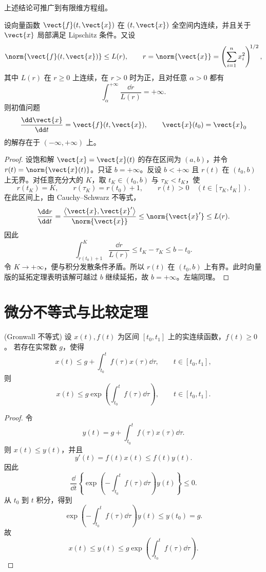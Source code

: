 上述结论可推广到有限维方程组。

\begin{theorem}[Wintner 定理]\label{cor:Wintner延拓定理}
	设向量函数 $\vect{f}(t,\vect{x})$ 在
	$(t,\vect{x})$ 全空间内连续，并且关于 $\vect{x}$ 局部满足
	Lipschitz 条件。又设
	\[
		\norm{\vect{f}(t,\vect{x})}\leq L(r),
		\qquad
		r=\norm{\vect{x}}
		=\left(\sum_{i=1}^{n}x_i^2\right)^{\!1/2},
	\]
	其中 $L(r)$ 在 $r\geq0$ 上连续，在 $r>0$ 时为正，且对任意
	$\alpha>0$ 都有
	\[
		\int_{\alpha}^{+\infty}\dfrac{\dd r}{L(r)}=+\infty.
	\]
	则初值问题
	\[
		\dfrac{\dd\vect{x}}{\dd t}=\vect{f}(t,\vect{x}),
		\qquad
		\vect{x}(t_0)=\vect{x}_0
	\]
	的解存在于 $(-\infty,+\infty)$ 上。
\end{theorem}

\begin{proof}
	设饱和解 $\vect{x}=\vect{x}(t)$ 的存在区间为 $(a,b)$，并令
	$r(t)=\norm{\vect{x}(t)}$。只证 $b=+\infty$。反设 $b<+\infty$ 且
	$r(t)$ 在 $(t_0,b)$ 上无界。对任意充分大的 $K$，取
	$t_K\in(t_0,b)$ 与 $\tau_K<t_K$，使
	\[
		r(t_K)=K,
		\qquad
		r(\tau_K)=r(t_0)+1,
		\qquad
		r(t)>0\quad(t\in[\tau_K,t_K]).
	\]
	在此区间上，由 Cauchy--Schwarz 不等式，
	\[
		\dfrac{\dd r}{\dd t}
		=\dfrac{\left\langle\vect{x},\vect{x}'\right\rangle}
		{\norm{\vect{x}}}
		\leq\norm{\vect{x}'}
		\leq L(r).
	\]
	因此
	\[
		\int_{r(t_0)+1}^{K}\dfrac{\dd r}{L(r)}
		\leq t_K-\tau_K
		\leq b-t_0.
	\]
	令 $K\to+\infty$，便与积分发散条件矛盾。所以 $r(t)$ 在
	$(t_0,b)$ 上有界。此时向量版的延拓定理表明该解可越过 $b$
	继续延拓，故 $b=+\infty$。左端同理。
\end{proof}

\section{微分不等式与比较定理}\label{sec:微分不等式与比较定理}

\begin{theorem}(Gronwall 不等式)\label{thm:Gronwall不等式}
	设 $x(t),f(t)$ 为区间 $[t_0,t_1]$ 上的实连续函数，$f(t)\geq0$。
	若存在实常数 $g$，使得
	\[
		x(t)\leq g+\int_{t_0}^{t}f(\tau)x(\tau)\dd\tau,
		\qquad t\in[t_0,t_1],
	\]
	则
	\[
		x(t)\leq g\exp\left(\int_{t_0}^{t}f(\tau)\dd\tau\right),
		\qquad t\in[t_0,t_1].
	\]
\end{theorem}

\begin{proof}
	令
	\[
		y(t)=g+\int_{t_0}^{t}f(\tau)x(\tau)\dd\tau.
	\]
	则 $x(t)\leq y(t)$，并且
	\[
		y'(t)=f(t)x(t)\leq f(t)y(t).
	\]
	因此
	\[
		\dfrac{\dd}{\dd t}
		\left\{
		\exp\left(-\int_{t_0}^{t}f(\tau)\dd\tau\right)y(t)
		\right\}\leq0.
	\]
	从 $t_0$ 到 $t$ 积分，得到
	\[
		\exp\left(-\int_{t_0}^{t}f(\tau)\dd\tau\right)y(t)
		\leq y(t_0)=g.
	\]
	故
	\[
		x(t)\leq y(t)
		\leq g\exp\left(\int_{t_0}^{t}f(\tau)\dd\tau\right).
	\]
\end{proof}

